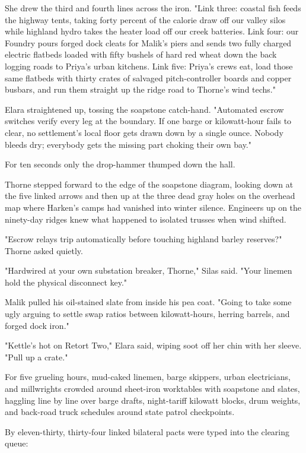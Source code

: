 She drew the third and fourth lines across the iron. "Link three: coastal fish feeds the highway tents, taking forty percent of the calorie draw off our valley silos while highland hydro takes the heater load off our creek batteries. Link four: our Foundry pours forged dock cleats for Malik's piers and sends two fully charged electric flatbeds loaded with fifty bushels of hard red wheat down the back logging roads to Priya's urban kitchens. Link five: Priya's crews eat, load those same flatbeds with thirty crates of salvaged pitch-controller boards and copper busbars, and run them straight up the ridge road to Thorne's wind techs."

Elara straightened up, tossing the soapstone catch-hand. "Automated escrow switches verify every leg at the boundary. If one barge or kilowatt-hour fails to clear, no settlement's local floor gets drawn down by a single ounce. Nobody bleeds dry; everybody gets the missing part choking their own bay."

For ten seconds only the drop-hammer thumped down the hall.

Thorne stepped forward to the edge of the soapstone diagram, looking down at the five linked arrows and then up at the three dead gray holes on the overhead map where Harken's camps had vanished into winter silence. Engineers up on the ninety-day ridges knew what happened to isolated trusses when wind shifted.

"Escrow relays trip automatically before touching highland barley reserves?" Thorne asked quietly.

"Hardwired at your own substation breaker, Thorne," Silas said. "Your linemen hold the physical disconnect key."

Malik pulled his oil-stained slate from inside his pea coat. "Going to take some ugly arguing to settle swap ratios between kilowatt-hours, herring barrels, and forged dock iron."

"Kettle's hot on Retort Two," Elara said, wiping soot off her chin with her sleeve. "Pull up a crate."

For five grueling hours, mud-caked linemen, barge skippers, urban electricians, and millwrights crowded around sheet-iron worktables with soapstone and slates, haggling line by line over barge drafts, night-tariff kilowatt blocks, drum weights, and back-road truck schedules around state patrol checkpoints.

By eleven-thirty, thirty-four linked bilateral pacts were typed into the clearing queue:


